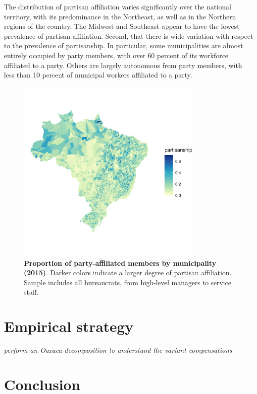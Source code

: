 \documentclass[12pt,a4paper]{article}
\begin{document}
The distribution of partisan affiliation varies significantly over the national territory, with its predominance in the Northeast, as well as in the Northern regions of the country. The Midwest and Southeast appear to have the lowest prevalence of partisan affiliation. Second, that there is wide variation with respect to the prevalence of partisanship. In particular, some municipalities are almost entirely occupied by party members, with over 60 percent of its workforce affiliated to a party. Others are largely autonomous from party members, with less than 10 percent of municipal workers affiliated to a party.

\begin{figure}[H]
    \centering
    \includegraphics[width = 9cm, height = 9cm]{figures/maps/pooled.png}
    \caption{\textbf{Proportion of party-affiliated members by municipality (2015)}. Darker colors indicate a larger degree of partisan affiliation. Sample includes all bureaucrats, from high-level managers to service staff.}
    \label{fig:map_pooled}
\end{figure}

\section{Empirical strategy}
\label{sec:empirical}

\emph{perform an Oaxaca decomposition to understand the variant compensations}

\section{Conclusion}
\label{sec:conclusion}

\newpage


\end{document}
